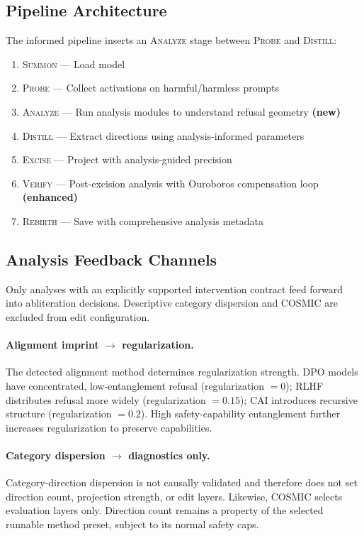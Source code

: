 \documentclass[11pt]{article}
\begin{document}
\subsection{Pipeline Architecture}

The informed pipeline inserts an \textsc{Analyze} stage between \textsc{Probe} and \textsc{Distill}:

\begin{enumerate}[leftmargin=*]
    \item \textsc{Summon} --- Load model
    \item \textsc{Probe} --- Collect activations on harmful/harmless prompts
    \item \textsc{Analyze} --- Run analysis modules to understand refusal geometry \textbf{(new)}
    \item \textsc{Distill} --- Extract directions using analysis-informed parameters
    \item \textsc{Excise} --- Project with analysis-guided precision
    \item \textsc{Verify} --- Post-excision analysis with Ouroboros compensation loop \textbf{(enhanced)}
    \item \textsc{Rebirth} --- Save with comprehensive analysis metadata
\end{enumerate}

\subsection{Analysis Feedback Channels}

Only analyses with an explicitly supported intervention contract feed forward into abliteration decisions. Descriptive category dispersion and COSMIC are excluded from edit configuration.

\paragraph{Alignment imprint $\to$ regularization.}
The detected alignment method determines regularization strength.
DPO models have concentrated, low-entanglement refusal (regularization $= 0$);
RLHF distributes refusal more widely (regularization $= 0.15$);
CAI introduces recursive structure (regularization $= 0.2$).
High safety-capability entanglement further increases regularization to preserve capabilities.

\paragraph{Category dispersion $\to$ diagnostics only.}
Category-direction dispersion is not causally validated and therefore does not set direction count, projection strength, or edit layers. Likewise, COSMIC selects evaluation layers only. Direction count remains a property of the selected runnable method preset, subject to its normal safety caps.
\end{document}
